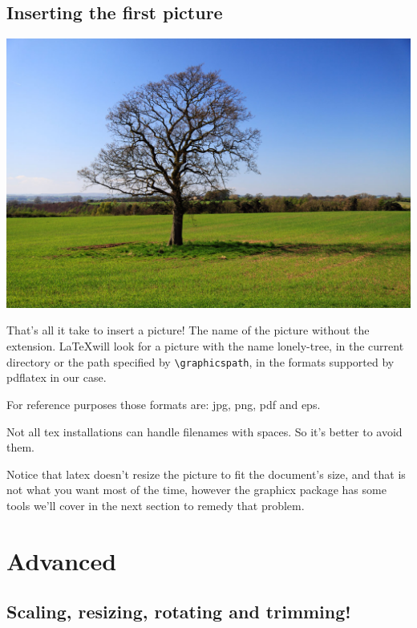 \documentclass[a4paper]{article}
\begin{document}
\subsection{Inserting the first picture}
\includegraphics{lonely-tree}

That's all it take to insert a picture! The name of the picture without the
extension. \LaTeX will look for a picture with the name lonely-tree, in the
current directory or the path specified by \verb`\graphicspath`, in the formats
supported by pdflatex in our case.

For reference purposes those formats are: jpg, png, pdf and eps.

Not all tex installations can handle filenames with spaces. So it's better to
avoid them.

Notice that latex doesn't resize the picture to fit the document's size, and
that is not what you want most of the time, however the graphicx package has
some tools we'll cover in the next section to remedy that problem.


\section{Advanced}

\subsection{Scaling, resizing, rotating and trimming!}
\end{document}
